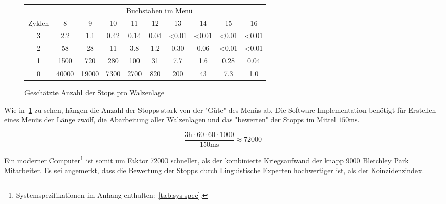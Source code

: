 \begin{figure}[htbp]
	\centering
	\caption{Geschätzte Anzahl der Stops pro Walzenlage~\autocite{enwiki:bombe}}
	\label{fig:num-stops}
	\begin{tabular}{|c||c|c|c|c|c|c|c|c|c|}
		\hline
		& \multicolumn{9}{c|}{Buchstaben im Menü} \\
		Zyklen & 8 & 9 & 10 & 11 & 12 & 13 & 14 & 15 & 16 \\
		\hhline{|=||=|=|=|=|=|=|=|=|=|}
		3 & 2.2  & 1.1  & 0.42  & 0.14  & 0.04  & <0.01  & <0.01  & <0.01  & <0.01 \\
		\hline
		2 & 58  & 28  & 11  & 3.8  & 1.2  & 0.30  & 0.06  & <0.01  & <0.01  \\
		\hline
		1 & 1500  & 720  & 280  & 100  & 31  & 7.7  & 1.6  & 0.28  & 0.04  \\
		\hline
		0 & 40000  & 19000  & 7300  & 2700  & 820  & 200  & 43  & 7.3  & 1.0  \\
		\hline
	\end{tabular}
\end{figure}


Wie in~\cref{fig:num-stops} zu sehen, hängen die Anzahl der Stopps stark von der "Güte" des Menüs ab.
Die Software-Implementation benötigt für Erstellen eines Menüs der Länge zwölf, die Abarbeitung aller Walzenlagen und das "bewerten" der Stopps im Mittel
$150\si{\ms}$.

\[
\frac{3\si{\hour} \cdot 60 \cdot 60 \cdot 1000}{150\si{\ms}} \approx 72000
\]

Ein moderner Computer\footnote{Systemspezifikationen im Anhang enthalten:~\cref{tab:sys-spec}.} ist somit um Faktor 72000 schneller, als der kombinierte Kriegsaufwand der knapp 9000 Bletchley Park Mitarbeiter.
Es sei angemerkt, dass die Bewertung der Stopps durch Linguistische Experten hochwertiger ist, als der Koinzidenzindex.
